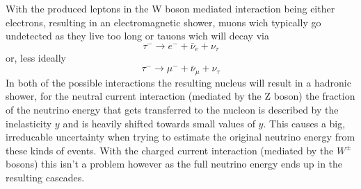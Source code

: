 \documentclass[11pt,a4paper,faculty=we,language=en,doctype=report]{cls/ugent-doc}
\begin{document}
With the produced leptons in the W boson mediated interaction being either electrons,
resulting in an electromagnetic shower, muons wich typically go undetected as they live
too long or
tauons wich will decay via
\begin{equation}
	\tau^- \rightarrow e^- + \bar{\nu}_e + \nu_\tau
\end{equation}
or, less ideally
\begin{equation}
	\tau^- \rightarrow \mu^- + \bar{\nu}_\mu + \nu_\tau
\end{equation}
In both of the possible interactions the resulting nucleus will result in a 
hadronic shower, for the neutral current interaction (mediated by the Z boson) 
the fraction of the neutrino energy that gets transferred to the nucleon
is described by the inelasticity $y$ and is heavily shifted towards small
values of $y$\cite{elasticity_y}. This causes a big, irreducable uncertainty
when trying to estimate the original
neutrino energy from these kinds of events. 
With the charged current interaction (mediated by the $W^\pm$ bosons) this 
isn't a problem however as the full neutrino energy
ends up in the resulting cascades.
\end{document}
